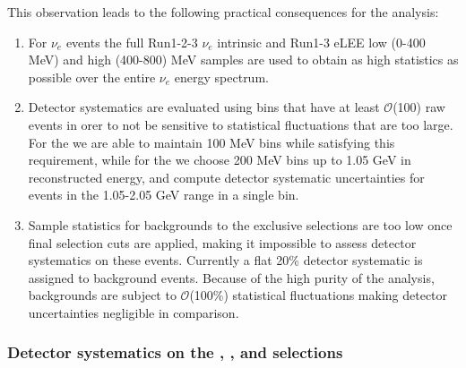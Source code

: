 \par This observation leads to the following practical consequences for the analysis:
\begin{enumerate}
    \item For $\nu_e$ events the full Run1-2-3 $\nu_e$ intrinsic and Run1-3 eLEE low (0-400 MeV) and high (400-800) MeV samples are used to obtain as high statistics as possible over the entire $\nu_e$ energy spectrum.
    \item Detector systematics are evaluated using bins that have at least $\mathcal{O}$(100) raw events in orer to not be sensitive to statistical fluctuations that are too large. For the \npsel we are able to maintain 100 MeV bins while satisfying this requirement, while for the \zpsel we choose 200 MeV bins up to 1.05 GeV in reconstructed energy, and compute detector systematic uncertainties for events in the 1.05-2.05 GeV range in a single bin.
    \item Sample statistics for backgrounds to the exclusive \nue selections are too low once final selection cuts are applied, making it impossible to assess detector systematics on these events. Currently a flat 20\% detector systematic is assigned to \nue background events. Because of the high purity of the analysis, backgrounds are subject to $\mathcal{O}$(100\%) statistical fluctuations making detector uncertainties negligible in comparison.
\end{enumerate}

\subsubsection{Detector systematics on the \npsel, \zpsel, and \numu selections}
\label{sec:detsys:selections}

